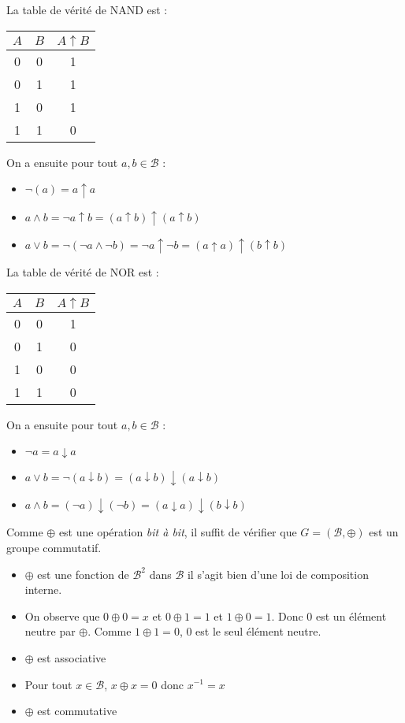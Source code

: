 \documentclass[../main.tex]{subfiles}
\begin{document}
\\ \\
La table de vérité de NAND est :
\begin{center}
\begin{tabular}{c|c|c}
$A$ & $B$ & $A\uparrow{B}$ \\
\hline
0 & 0 & 1 \\
0 & 1 & 1 \\
1 & 0 & 1 \\
1 & 1 & 0 \\
\end{tabular}
\end{center}
On a ensuite pour tout $a, b\in{\mathcal{B}}$ :
\begin{itemize}
	\item $\neg(a) = a\uparrow{a}$
	\item $a\wedge b = \neg{a\uparrow{b}} = (a\uparrow{b})\uparrow(a\uparrow{b})$
	\item $a\vee b = \neg{(\neg a \wedge \neg{b})} = \neg{a}\uparrow\neg{b} = (a\uparrow a) \uparrow (b\uparrow b)$
\end{itemize}
La table de vérité de NOR est :
\begin{center}
\begin{tabular}{c|c|c}
$A$ & $B$ & $A\uparrow{B}$ \\
\hline
0 & 0 & 1 \\
0 & 1 & 0 \\
1 & 0 & 0 \\
1 & 1 & 0 \\
\end{tabular}
\end{center}
On a ensuite pour tout $a, b\in{\mathcal{B}}$ :
\begin{itemize}
	\item $\neg a = a\downarrow a$
	\item $a \vee b = \neg{(a \downarrow b)} = (a\downarrow b) \downarrow (a\downarrow b)$
	\item $a\wedge b = (\neg a)\downarrow (\neg b) = (a\downarrow a) \downarrow (b\downarrow b)$
\end{itemize}
 Comme $\oplus$ est une opération \textit{bit à bit}, il suffit de vérifier que $G = (\mathcal{B}, \oplus)$ est un groupe commutatif.
\begin{itemize}
	\item $\oplus$ est une fonction de $\mathcal{B}^{2}$ dans $\mathcal{B}$ il s'agit bien d'une loi de composition interne.
	\item On observe que $0\oplus0 = x$ et $0\oplus 1 = 1$ et $1\oplus 0 = 1$. Donc $0$ est un élément neutre par $\oplus$. Comme $1\oplus1 = 0$, 0 est le seul élément neutre.
	\item $\oplus$ est associative
	\item Pour tout $x\in{\mathcal{B}}$, $x\oplus x = 0$ donc $x^{-1} = x$
	\item $\oplus$ est commutative
\end{itemize}
\end{document}
